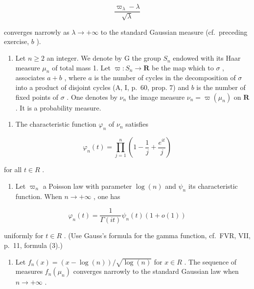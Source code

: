 \[
\frac {\varpi_ {\lambda} - \lambda}{\sqrt {\lambda}}
\]

converges narrowly as \(\lambda\to+\infty\) to the standard Gaussian measure (cf.~preceding exercise, \(b\) ).

\begin{enumerate}
\def\labelenumi{\arabic{enumi})}
\setcounter{enumi}{41}
\tightlist
\item
  Let \(n \geqslant 2\) an integer. We denote by G the group \(S_{n}\) endowed with its Haar measure \(\mu_{n}\) of total mass 1. Let \(\varpi: S_{n} \to \mathbf{R}\) be the map which to \(\sigma\) , associates \(a + b\) , where \(a\) is the number of cycles in the decomposition of \(\sigma\) into a product of disjoint cycles (A, I, p.~60, prop. 7) and \(b\) is the number of fixed points of \(\sigma\) . One denotes by \(\nu_{n}\) the image measure \(\nu_{n} = \varpi(\mu_{n})\) on \(\mathbf{R}\) . It is a probability measure.
\end{enumerate}

\begin{enumerate}
\def\labelenumi{\alph{enumi})}
\tightlist
\item
  The characteristic function \(\varphi_{n}\) of \(\nu_{n}\) satisfies
\end{enumerate}

\[
\varphi_ {n} (t) = \prod_ {j = 1} ^ {n} \left(1 - \frac {1}{j} + \frac {e ^ {i t}}{j}\right)
\]

for all \(t \in R\) .

\begin{enumerate}
\def\labelenumi{\alph{enumi})}
\setcounter{enumi}{1}
\tightlist
\item
  Let \(\varpi_{n}\) a Poisson law with parameter \(\log(n)\) and \(\psi_{n}\) its characteristic function. When \(n \to +\infty\) , one has
\end{enumerate}

\[
\varphi_ {n} (t) = \frac {1}{\Gamma (i t)} \psi_ {n} (t) (1 + o (1))
\]

uniformly for \(t \in R\) . (Use Gauss's formula for the gamma function, cf.~FVR, VII, p.~11, formula (3).)

\begin{enumerate}
\def\labelenumi{\alph{enumi})}
\setcounter{enumi}{2}
\tightlist
\item
  Let \(f_{n}(x) = (x - \log(n))/\sqrt{\log(n)}\) for \(x \in R\) . The sequence of measures \(f_{n}(\mu_{n})\) converges narrowly to the standard Gaussian law when \(n \to +\infty\) .
\end{enumerate}

